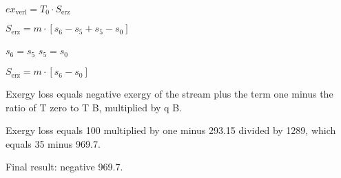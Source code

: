 \( ex_{\text{verl}} = T_0 \cdot S_{\text{erz}} \)  

\( S_{\text{erz}} = m \cdot \left[ s_6 - s_5 + s_5 - s_0 \right] \)  

\( s_6 = s_5 \)  
\( s_5 = s_0 \)  

\( S_{\text{erz}} = m \cdot \left[ s_6 - s_0 \right] \)

Exergy loss equals negative exergy of the stream plus the term one minus the ratio of T zero to T B, multiplied by q B.  

Exergy loss equals 100 multiplied by one minus 293.15 divided by 1289, which equals 35 minus 969.7.  

Final result: negative 969.7.